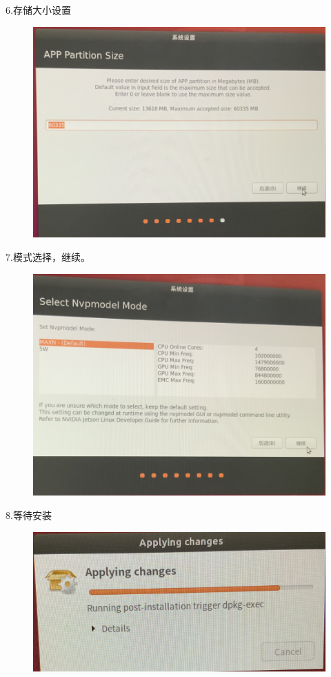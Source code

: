 \documentclass[openbib]{article}
\begin{document}
6.存储大小设置
\begin{figure}[H]
	\centering
	\includegraphics[scale=0.3]{05}
\end{figure}

7.模式选择，继续。
\begin{figure}[H]
	\centering
	\includegraphics[scale=0.3]{07}
\end{figure}

8.等待安装
\begin{figure}[H]
	\centering
	\includegraphics[scale=0.3]{c1}
\end{figure}
\end{document}

